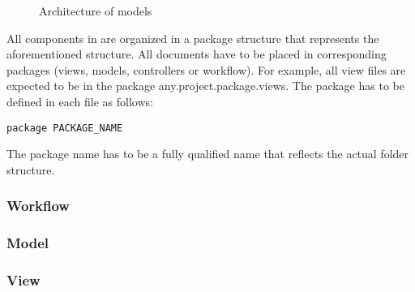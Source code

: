 
\begin{figure}[htb!]
\centering
{}
\caption{Architecture of \MD models}
\label{fig:MD2Arch}
\end{figure}

All components in \MD are organized in a package structure that represents the aforementioned structure. All documents have to be placed in corresponding packages (views, models, controllers or workflow). For example, all view files are expected to be in the package any.project.package.views. The package has to be defined in each \MD file as follows:
\begin{lstlisting}
package PACKAGE_NAME
\end{lstlisting}
The package name has to be a fully qualified name that reflects the actual folder structure.

\subsubsection{Workflow} 
\label{subsubsec:Workflow}


\subsubsection{Model} 
\label{subsubsec:Model}


\subsubsection{View} 
\label{subsubsec:View}


